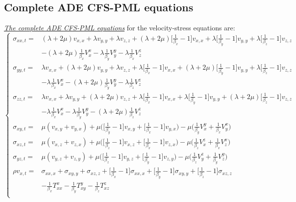 \documentclass{article}
\newcommand{\mynem}[1]{\textsl{\uline{#1}}}
\begin{document}
\subsection{Complete ADE CFS-PML equations}
\mynem{The complete ADE CFS-PML equations} for the velocity-stress equations are:
\begin{equation*}
 \left\{
  \begin{aligned}
    \sigma_{xx,t}= & (\lambda+2\mu)v_{x,x}+\lambda v_{y,y}+\lambda v_{z,z}+(\lambda+2\mu)\Big[\frac{1}{\beta_x}-1\Big]v_{x,x}+\lambda\Big[\frac{1}{\beta_y}-1\Big]v_{y,y}+\lambda\Big[\frac{1}{\beta_z}-1\Big]v_{z,z} \\
      & -(\lambda+2\mu)\frac{1}{\beta_x}V_x^x-\lambda\frac{1}{\beta_y}V_y^y-\lambda\frac{1}{\beta_x}V_z^z \\
    \sigma_{yy,t}= & \lambda v_{x,x}+(\lambda+2\mu)v_{y,y}+\lambda v_{z,z}+\lambda\Big[\frac{1}{\beta_x}-1\Big]v_{x,x}+(\lambda+2\mu)\Big[\frac{1}{\beta_y}-1\Big]v_{y,y}+\lambda\Big[\frac{1}{\beta_z}-1\Big]v_{z,z} \\
      & -\lambda\frac{1}{\beta_x}V_x^x-(\lambda+2\mu)\frac{1}{\beta_y}V_y^y-\lambda\frac{1}{\beta_z}V_z^z \\
    \sigma_{zz,t}= & \lambda v_{x,x}+\lambda v_{y,y}+(\lambda+2\mu)v_{z,z}+\lambda\Big[\frac{1}{\beta_x}-1\Big]v_{x,x}+\lambda\Big[\frac{1}{\beta_y}-1\Big]v_{y,y}+(\lambda+2\mu)\Big[\frac{1}{\beta_z}-1\Big]v_{z,z} \\
      & -\lambda\frac{1}{\beta_x}V_x^x-\lambda\frac{1}{\beta_y}V_y^y-(\lambda+2\mu)\frac{1}{\beta_z}V_z^z \\
    \sigma_{xy,t}= & \mu(v_{x,y}+v_{y,x})+\mu\Big(\Big[\frac{1}{\beta_y}-1\Big]v_{x,y}+\Big[\frac{1}{\beta_x}-1\Big]v_{y,x}\Big)-\mu\Big(\frac{1}{\beta_y}V_x^y+\frac{1}{\beta_x}V_y^x\Big) \\
    \sigma_{xz,t}= & \mu(v_{x,z}+v_{z,x})+\mu\Big(\Big[\frac{1}{\beta_z}-1\Big]v_{x,z}+\Big[\frac{1}{\beta_x}-1\Big]v_{z,x}\Big)-\mu\Big(\frac{1}{\beta_z}V_x^z+\frac{1}{\beta_x}V_z^x\Big) \\
    \sigma_{yz,t}= & \mu(v_{y,z}+v_{z,y})+\mu\Big(\Big[\frac{1}{\beta_z}-1\Big]v_{y,z}+\Big[\frac{1}{\beta_y}-1\Big]v_{z,y}\Big)-\mu\Big(\frac{1}{\beta_z}V_y^z+\frac{1}{\beta_y}V_z^y\Big) \\
    \rho v_{x,t}= & \sigma_{xx,x}+\sigma_{xy,y}+\sigma_{xz,z}+\Big[\frac{1}{\beta_x}-1\Big]\sigma_{xx,x}+\Big[\frac{1}{\beta_y}-1\Big]\sigma_{xy,y}+\Big[\frac{1}{\beta_z}-1\Big]\sigma_{xz,z} \\
      & -\frac{1}{\beta_x}T_{xx}^x-\frac{1}{\beta_y}T_{xy}^y-\frac{1}{\beta_z}T_{xz}^z \\

\end{aligned}
\end{equation*}
\end{document}
